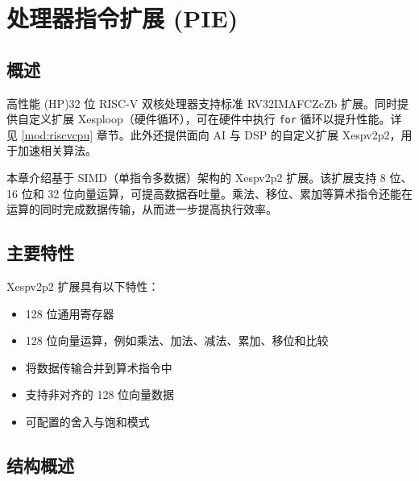 \documentclass[main\_\_CN.tex]{subfiles}
\begin{document}

\ifglobal
\else
    {\let\clearpage\relax \listoftodos}
    {\let\clearpage\relax \listofdonetodos}
    \tableofcontents
\fi



\hypertarget{pie}{}
\chapter{处理器指令扩展 (PIE)}
\label{mod:pie}

\section{概述}
\chipname{} 高性能 (HP)32 位 RISC-V 双核处理器支持标准 RV32IMAFCZcZb 扩展。同时提供自定义扩展 Xesploop（硬件循环），可在硬件中执行 \texttt{for} 循环以提升性能。详见 \ref{mod:riscvcpu} 章节。此外还提供面向 AI 与 DSP 的自定义扩展 Xespv2p2，用于加速相关算法。

本章介绍基于 SIMD（单指令多数据）架构的 Xespv2p2 扩展。该扩展支持 8 位、16 位和 32 位向量运算，可提高数据吞吐量。乘法、移位、累加等算术指令还能在运算的同时完成数据传输，从而进一步提高执行效率。




\section{主要特性}

Xespv2p2 扩展具有以下特性：

\begin{itemize}
    \item 128 位通用寄存器
    \item 128 位向量运算，例如乘法、加法、减法、累加、移位和比较
    \item 将数据传输合并到算术指令中
    \item 支持非对齐的 128 位向量数据
    \item 可配置的舍入与饱和模式

\end{itemize}

\section{结构概述}
\end{document}
